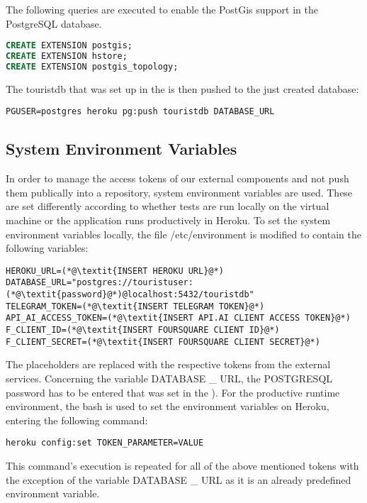 The following queries are executed to enable the PostGis support in the PostgreSQL database.
\begin{lstlisting}[language=SQL]
CREATE EXTENSION postgis;
CREATE EXTENSION hstore;
CREATE EXTENSION postgis_topology;
\end{lstlisting}

The touristdb that was set up in the  is then pushed to the just created database:

\begin{lstlisting}
PGUSER=postgres heroku pg:push touristdb DATABASE_URL
\end{lstlisting}


\subsection{System Environment Variables}\label{sssec:sev}
In order to manage the access tokens of our external components and not push them publically into a repository, system environment variables are used. These are set differently according to whether tests are run locally on the virtual machine or the application runs productively in Heroku. To set the system environment variables locally, the file /etc/environment is modified to contain the following variables:

\begin{lstlisting}
HEROKU_URL=(*@\textit{INSERT HEROKU URL}@*)
DATABASE_URL="postgres://touristuser:(*@\textit{password}@*)@localhost:5432/touristdb"
TELEGRAM_TOKEN=(*@\textit{INSERT TELEGRAM TOKEN}@*)
API_AI_ACCESS_TOKEN=(*@\textit{INSERT API.AI CLIENT ACCESS TOKEN}@*)
F_CLIENT_ID=(*@\textit{INSERT FOURSQUARE CLIENT ID}@*)
F_CLIENT_SECRET=(*@\textit{INSERT FOURSQUARE CLIENT SECRET}@*)
\end{lstlisting}

The placeholders are replaced with the respective tokens from the external services. Concerning the variable DATABASE \_ URL, the POSTGRESQL password has to be entered that was set in the ). For the productive runtime environment, the bash is used to set the environment variables on Heroku, entering the following command:

\begin{lstlisting}
heroku config:set TOKEN_PARAMETER=VALUE
\end{lstlisting}

This command’s execution is repeated for all of the above mentioned tokens with the exception of the variable DATABASE \_ URL as it is an already predefined environment variable.

